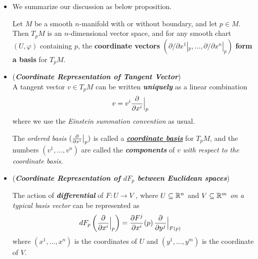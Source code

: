 \documentclass[11pt]{article}
\begin{document}
\begin{itemize}
\item We summarize our discussion as below proposition.
\begin{proposition}
Let $M$ be a smooth $n$-manifold with or without boundary, and let $p \in M$. Then $T_{p}M$ is an $n$-dimensional vector space, and for any smooth chart $(U, \varphi)$ containing $p$, the \textbf{coordinate vectors} $(\partial / \partial x^{1}|_{p}, \ldots, \partial / \partial  x^{n}|_{p})$ \textbf{form a basis} for $T_{p}M$.
\end{proposition}

\item 
\begin{definition}  (\emph{\textbf{Coordinate Representation of Tangent Vector}})\\
A tangent vector $v \in T_{p}M$ can be written \textbf{\emph{uniquely}} as a linear combination
\begin{align}
v&=v^{i} \frac{\partial }{ \partial x^{i}}\Bigr|_{p} \label{eqn: tangent_vec_decomp}
\end{align} where we use the \emph{Einstein summation convention} as usual. 

The \emph{ordered basis} $(\frac{\partial }{ \partial x^{i}}\big|_{p})$ is called a \underline{\emph{\textbf{coordinate basis}}} for $T_{p}M$, and the numbers $(v^1, \ldots, v^n)$ are called the \emph{\textbf{components}} of $v$ \emph{with respect to the coordinate basis}.
\end{definition}

\item \begin{remark} (\emph{\textbf{Coordinate Representation of $dF_p$ between Euclidean spaces}})
\begin{definition}
The action of \emph{\textbf{differential}} of $F: U \rightarrow V$ , where $U \subseteq {\mathbb R}^n$ and $V \subseteq {\mathbb R}^m$ \emph{on a typical basis vector} can be represented as
\begin{align}
dF_p\left(\frac{\partial }{ \partial x^{i}}\Bigr|_{p}\right) &= \frac{\partial F^{j}}{ \partial x^{i}}(p)\,\frac{\partial }{ \partial y^{j}}\Bigr|_{F(p)} \label{eqn: differential_coordinate}
\end{align} where $(x^1,\ldots, x^n)$ is the coordinates of $U$ and $(y^1,\ldots, y^m)$ is the coordinate of $V$.
\end{definition} 


\end{remark}
\end{itemize}
\end{document}

